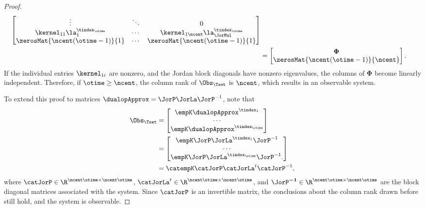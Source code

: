 \begin{proof}
\begin{align*}
\begin{bmatrix}
    \vdots & \ddots & 0\\
    \kernel_{11}\la_1^{\tindex_{\otime}} & \cdots 
    & \kernel_{1\ncent}\la_{\JorMul}^{\tindex_{\otime}}\\
    \zerosMat{\ncent(\otime-1)}{1} & \cdots & \zerosMat{\ncent(\otime-1)}{1}
   \end{bmatrix}\\
   &= 
   \begin{bmatrix}
    \boldsymbol{\Phi}\\
    \zerosMat{\ncent(\otime-1)}{\ncent}
   \end{bmatrix}.
\end{align*}
If the individual entries $\kernel_{1i}$ are nonzero, and the Jordan block diagonals have nonzero eigenvalues, the columns of $\boldsymbol\Phi$
become linearly independent. Therefore, if $\otime \geq \ncent$, the column rank of $\Obs_{\Tset}$ is $\ncent$, which results in an observable system.

To extend this proof to matrices $\dualopApprox = \JorP\JorLa\JorP^{-1}$, note that 
\begin{align*}
 \Obs_{\Tset} &= 
 \begin{bmatrix}
  \empK \dualopApprox^{\tindex_1}\\
  \cdots\\
  \empK \dualopApprox^{\tindex_\otime}
 \end{bmatrix}\\
 &=
  \begin{bmatrix}
  \empK \JorP\JorLa^{\tindex_1}\JorP^{-1}\\
  \cdots\\
  \empK \JorP\JorLa^{\tindex_\otime}\JorP^{-1}.
 \end{bmatrix}\\
 &=
 \catempK
 \catJorP
 \catJorLa^t
 \catJorP^{-1},
\end{align*} 
where $\catJorP\in\R^{\ncent\otime\times\ncent\otime}$, $\catJorLa^t\in\R^{\ncent\otime\times\ncent\otime}$, and
$\boldsymbol{\JorP^{-1}}\in\R^{\ncent\otime\times\ncent\otime}$ are the block diagonal matrices associated with the system. 
Since $\catJorP$ is an invertible matrix, the conclusions about the column rank drawn before still hold, and the system is observable. 
\end{proof}


